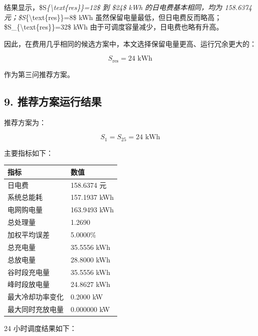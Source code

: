 \documentclass[
]{article}
\begin{document}
结果显示，\$S\emph{\{\textbackslash text\{res\}\}=12\$ 到 \$24\$ kWh
的日电费基本相同，均为 158.6374
元；\$S}\{\textbackslash text\{res\}\}=8\$ kWh
虽然保留电量最低，但日电费反而略高；\$S\_\{\textbackslash text\{res\}\}=32\$
kWh 由于可调度容量减少，日电费也略有升高。

因此，在费用几乎相同的候选方案中，本文选择保留电量更高、运行冗余更大的：

\[S_{\text{res}}=24\text{ kWh}\]

作为第三问推荐方案。

\subsection{9.
推荐方案运行结果}\label{9-ux63a8ux8350ux65b9ux6848ux8fd0ux884cux7ed3ux679c}

推荐方案为：

\[S_1=S_{25}=24\text{ kWh}\]

主要指标如下：

\begin{longtable}[]{@{}ll@{}}
\toprule\noalign{}
指标 & 数值 \\
\midrule\noalign{}
\endhead
\bottomrule\noalign{}
\endlastfoot
日电费 & 158.6374 元 \\
系统总能耗 & 157.1937 kWh \\
电网购电量 & 163.9493 kWh \\
总处理量 & 1.2690 \\
加权平均误差 & 5.0000\% \\
总充电量 & 35.5556 kWh \\
总放电量 & 28.8000 kWh \\
谷时段充电量 & 35.5556 kWh \\
峰时段放电量 & 24.8627 kWh \\
最大冷却功率变化 & 0.2000 kW \\
最大同时充放电量 & 0.000000 kW \\
\end{longtable}

24 小时调度结果如下：
\end{document}
